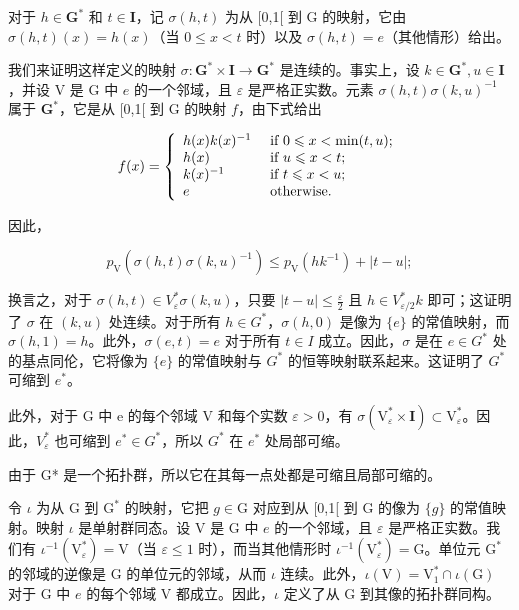 对于 \(h \in \mathbf{G}^*\) 和 \(t \in \mathbf{I}\)，记 \(\sigma(h, t)\) 为从 [0,1[ 到 G 的映射，它由 \(\sigma(h, t)(x) = h(x)\)（当 \(0 \leqslant x < t\) 时）以及 \(\sigma(h, t) = e\)（其他情形）给出。

我们来证明这样定义的映射 \(\sigma\colon\mathbf{G}^{*}\times\mathbf{I}\to\mathbf{G}^{*}\) 是连续的。事实上，设 \(k\in\mathbf{G}^{*}, u\in\mathbf{I}\)，并设 V 是 G 中 \(e\) 的一个邻域，且 \(\varepsilon\) 是严格正实数。元素 \(\sigma(h,t)\sigma(k,u)^{-1}\) 属于 \(\mathbf{G}^{*}\)，它是从 [0,1[ 到 G 的映射 \(f\)，由下式给出

\[
f (x) = \left\{ \begin{array}{l l} h (x) k (x) ^ {- 1} & \text { if } 0 \leqslant x <   \min (t, u); \\ h (x) & \text { if } u \leqslant x <   t; \\ k (x) ^ {- 1} & \text { if } t \leqslant x <   u; \\ e & \text { otherwise. } \end{array} \right.
\]

因此，

\[
p _ {\mathrm{V}} (\sigma (h, t) \sigma (k, u) ^ {- 1}) \leqslant p _ {\mathrm{V}} (h k ^ {- 1}) + | t - u |;
\]

换言之，对于 \(\sigma(h,t) \in V_{\varepsilon}^{*}\sigma(k,u)\)，只要 \(|t-u| \leqslant \frac{\varepsilon}{2}\) 且 \(h \in V_{\varepsilon/2}^{*}k\) 即可；这证明了 \(\sigma\) 在 \((k,u)\) 处连续。对于所有 \(h \in G^{*}\)，\(\sigma(h,0)\) 是像为 \(\{e\}\) 的常值映射，而 \(\sigma(h,1)=h\)。此外，\(\sigma(e,t)=e\) 对于所有 \(t \in I\) 成立。因此，\(\sigma\) 是在 \(e \in G^{*}\) 处的基点同伦，它将像为 \(\{e\}\) 的常值映射与 \(G^{*}\) 的恒等映射联系起来。这证明了 \(G^{*}\) 可缩到 \(e^{*}\)。

此外，对于 G 中 e 的每个邻域 V 和每个实数 \(\varepsilon > 0\)，有 \(\sigma(\mathrm{V}_{\varepsilon}^{*} \times \mathbf{I}) \subset \mathrm{V}_{\varepsilon}^{*}\)。因此，\(V_{\varepsilon}^{*}\) 也可缩到 \(e^{*} \in G^{*}\)，所以 \(G^{*}\) 在 \(e^{*}\) 处局部可缩。

由于 G* 是一个拓扑群，所以它在其每一点处都是可缩且局部可缩的。

令 \(\iota\) 为从 G 到 \(\mathrm{G}^*\) 的映射，它把 \(g\in \mathrm{G}\) 对应到从 [0,1[ 到 G 的像为 \(\{g\}\) 的常值映射。映射 \(\iota\) 是单射群同态。设 V 是 G 中 \(e\) 的一个邻域，且 \(\varepsilon\) 是严格正实数。我们有 \(\iota^{-1}(\mathrm{V}_{\varepsilon}^{*}) = \mathrm{V}\)（当 \(\varepsilon \leqslant 1\) 时），而当其他情形时 \(\iota^{-1}(\mathrm{V}_{\varepsilon}^{*}) = \mathrm{G}\)。单位元 \(\mathrm{G}^*\) 的邻域的逆像是 G 的单位元的邻域，从而 \(\iota\) 连续。此外，\(\iota(\mathrm{V}) = \mathrm{V}_1^* \cap \iota(\mathrm{G})\) 对于 G 中 \(e\) 的每个邻域 V 都成立。因此，\(\iota\) 定义了从 G 到其像的拓扑群同构。

